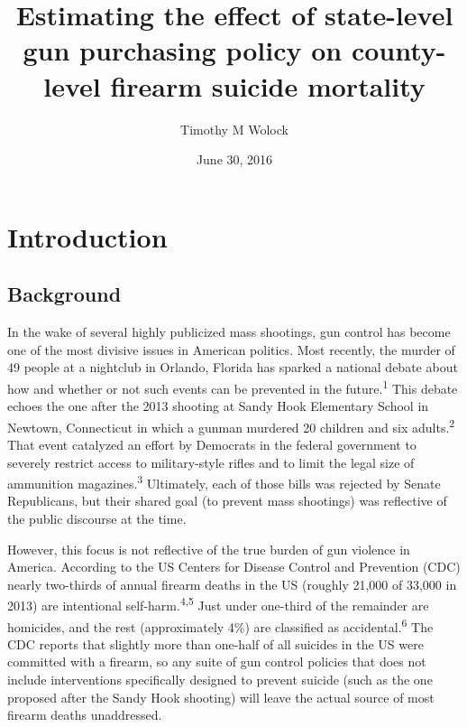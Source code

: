 \documentclass[]{article}
\title{Estimating the effect of state-level gun purchasing policy on
county-level firearm suicide mortality}
\author{Timothy M Wolock}
\date{June 30, 2016}
\begin{document}
\maketitle

{
\setcounter{tocdepth}{2}
\tableofcontents
}
\pagebreak

\section{Introduction}\label{introduction}

\subsection{Background}\label{background}

In the wake of several highly publicized mass shootings, gun control has
become one of the most divisive issues in American politics. Most
recently, the murder of 49 people at a nightclub in Orlando, Florida has
sparked a national debate about how and whether or not such events can
be prevented in the future.\textsuperscript{1} This debate echoes the
one after the 2013 shooting at Sandy Hook Elementary School in Newtown,
Connecticut in which a gunman murdered 20 children and six
adults.\textsuperscript{2} That event catalyzed an effort by Democrats
in the federal government to severely restrict access to military-style
rifles and to limit the legal size of ammunition
magazines.\textsuperscript{3} Ultimately, each of those bills was
rejected by Senate Republicans, but their shared goal (to prevent mass
shootings) was reflective of the public discourse at the time.

However, this focus is not reflective of the true burden of gun violence
in America. According to the US Centers for Disease Control and
Prevention (CDC) nearly two-thirds of annual firearm deaths in the US
(roughly 21,000 of 33,000 in 2013) are intentional
self-harm.\textsuperscript{4,5} Just under one-third of the remainder
are homicides, and the rest (approximately 4\%) are classified as
accidental.\textsuperscript{6} The CDC reports that slightly more than
one-half of all suicides in the US were committed with a firearm, so any
suite of gun control policies that does not include interventions
specifically designed to prevent suicide (such as the one proposed after
the Sandy Hook shooting) will leave the actual source of most firearm
deaths unaddressed.
\end{document}
